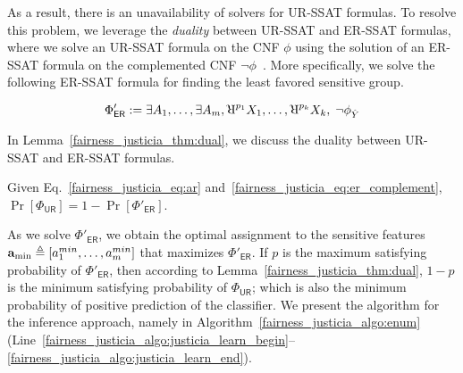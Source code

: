  As a result, there is an unavailability of solvers for UR-SSAT formulas. To resolve this problem, we leverage the \textit{duality} between UR-SSAT  and ER-SSAT formulas, where we solve an UR-SSAT formula on the CNF $ \phi $ using the solution of an ER-SSAT formula on the complemented CNF $ \neg \phi $~\cite{littman2001stochastic}. More specifically, we solve the following ER-SSAT formula for finding the least favored sensitive group.

\begin{equation}
	\Phi'_{\mathsf{ER}} := \exists A_1,\dots, \exists A_{\numsensitive},
	\R^{p_{1}}X_1, \dots, \R^{p_{\numnonsensitive}}X_{\numnonsensitive},   \; \neg \phi_{\hat{Y}}
	\label{fairness_justicia_eq:er_complement}
\end{equation}


In Lemma~\ref{fairness_justicia_thm:dual}, we discuss the duality between UR-SSAT and ER-SSAT formulas.


\begin{lemma}\label{fairness_justicia_thm:dual}
Given Eq.~\eqref{fairness_justicia_eq:ar} and~\eqref{fairness_justicia_eq:er_complement},	$ \Pr[\Phi_{\mathsf{UR}}] = 1 - \Pr[\Phi'_{\mathsf{ER}}]  $.
\end{lemma}


As we solve $\Phi'_{\mathsf{ER}}$, we obtain the optimal assignment to the sensitive features $\mathbf{a}_{\min} \triangleq [a^{min}_1, \dots, a^{min}_{m}]$ that maximizes $\Phi'_{\mathsf{ER}}$.  If $ p $ is the maximum satisfying probability of $ \Phi'_{\mathsf{ER}} $, then according to Lemma~\ref{fairness_justicia_thm:dual}, $ 1 - p $ is the minimum satisfying probability of $ \Phi_{\mathsf{UR}} $;  which is also the minimum probability of positive prediction of the classifier. We present the algorithm for the inference approach, namely {\justicialearn} in Algorithm~\ref{fairness_justicia_algo:enum} (Line~\ref{fairness_justicia_algo:justicia_learn_begin}--\ref{fairness_justicia_algo:justicia_learn_end}).

\iffalse
\begin{algorithm}[t!]
	\caption{\justicialearn: Learning ER-SSAT Encoding}
	\label{fairness_justicia_algo:learn}
	\begin{algorithmic}[1]
		\Function{{\justicialearn}}{$ X,A,\hat{Y} $}
		\State $ \phi_{\hat{Y}} = \mathsf{CNF}(\hat{Y}  = 1) $
		\State $ p_{i} = \mathsf{CalculateProb}(x_i), \forall x_i \in X $
		\State $  \Phi_\mathbf{ER} = \exists a_1,\dots, \exists a_{\numsensitive}, \R^{p_{1}}x_1, \dots, \R^{p_{\numnonsensitive}}x_{\numnonsensitive}. \; \phi_{\hat{Y}} $
		\State $  \Phi'_\mathbf{ER} = \exists a_1,\dots, \exists a_{\numsensitive}, \R^{p_{1}}x_1, \dots, \R^{p_{\numnonsensitive}}x_{\numnonsensitive}. \; \neg \phi_{\hat{Y}} $
		\State \Return $ \mathsf{SSAT}(\Phi_\mathbf{ER}), 1 - \mathsf{SSAT}(\Phi'_\mathbf{ER}) $
		\EndFunction
	\end{algorithmic}
\end{algorithm}
\fi

